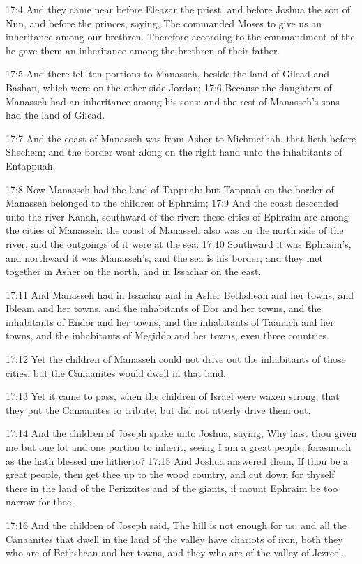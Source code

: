 17:4 And they came near before Eleazar the priest, and before Joshua the son of Nun, and before the princes, saying, The \LORD commanded Moses to give us an inheritance among our brethren. Therefore according to the commandment of the \LORD he gave them an inheritance among the brethren of their father.

17:5 And there fell ten portions to Manasseh, beside the land of Gilead and Bashan, which were on the other side Jordan; 17:6 Because the daughters of Manasseh had an inheritance among his sons: and the rest of Manasseh's sons had the land of Gilead.

17:7 And the coast of Manasseh was from Asher to Michmethah, that lieth before Shechem; and the border went along on the right hand unto the inhabitants of Entappuah.

17:8 Now Manasseh had the land of Tappuah: but Tappuah on the border of Manasseh belonged to the children of Ephraim; 17:9 And the coast descended unto the river Kanah, southward of the river: these cities of Ephraim are among the cities of Manasseh: the coast of Manasseh also was on the north side of the river, and the outgoings of it were at the sea: 17:10 Southward it was Ephraim's, and northward it was Manasseh's, and the sea is his border; and they met together in Asher on the north, and in Issachar on the east.

17:11 And Manasseh had in Issachar and in Asher Bethshean and her towns, and Ibleam and her towns, and the inhabitants of Dor and her towns, and the inhabitants of Endor and her towns, and the inhabitants of Taanach and her towns, and the inhabitants of Megiddo and her towns, even three countries.

17:12 Yet the children of Manasseh could not drive out the inhabitants of those cities; but the Canaanites would dwell in that land.

17:13 Yet it came to pass, when the children of Israel were waxen strong, that they put the Canaanites to tribute, but did not utterly drive them out.

17:14 And the children of Joseph spake unto Joshua, saying, Why hast thou given me but one lot and one portion to inherit, seeing I am a great people, forasmuch as the \LORD hath blessed me hitherto?  17:15 And Joshua answered them, If thou be a great people, then get thee up to the wood country, and cut down for thyself there in the land of the Perizzites and of the giants, if mount Ephraim be too narrow for thee.

17:16 And the children of Joseph said, The hill is not enough for us: and all the Canaanites that dwell in the land of the valley have chariots of iron, both they who are of Bethshean and her towns, and they who are of the valley of Jezreel.

